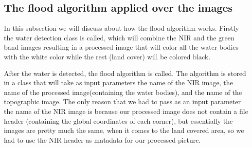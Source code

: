 \documentclass[12pt, a4paper]{report}
\begin{document}
\subsection{The flood algorithm applied over the images}

\quad
In this subsection we will discuss about how the flood algorithm works. Firstly the water detection class is called, which will combine the NIR and the green band images resulting in a processed image that will color all the water bodies with the white color while the rest (land cover) will be colored black.
\par 
 After the water is detected, the flood algorithm is called. The algorithm is stored in a class that will take as input parameters the name of the NIR image, the name of the processed image(containing the water bodies), and the name of the topographic image. The only reason that we had to pass as an input parameter the name of the NIR image is because our processed image does not contain a file header (containing the global coordinates of each corner), but essentially the images are pretty much the same, when it comes to the land covered area, so we had to use the NIR header as matadata for our processed picture.
\par
\end{document}
